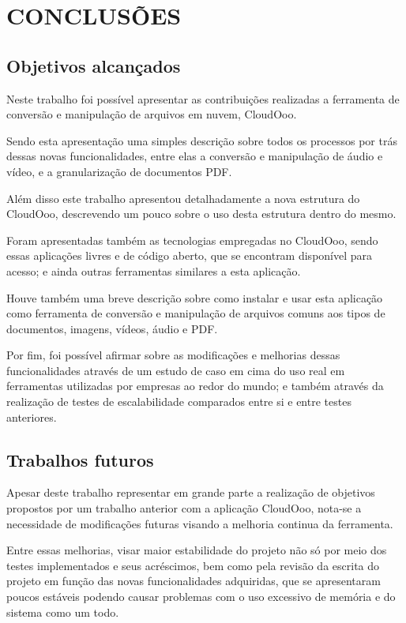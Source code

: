 \chapter{CONCLUSÕES}
\thispagestyle{empty}

\section{Objetivos alcançados}

Neste trabalho foi possível apresentar as contribuições realizadas a ferramenta de conversão e manipulação de arquivos em nuvem, CloudOoo.

Sendo esta apresentação uma simples descrição sobre todos os processos por trás dessas novas funcionalidades, entre elas a conversão e manipulação de áudio e vídeo, e a granularização de documentos PDF.

Além disso este trabalho apresentou detalhadamente a nova estrutura do CloudOoo, descrevendo um pouco sobre o uso desta estrutura dentro do mesmo.

Foram apresentadas também as tecnologias empregadas no CloudOoo, sendo essas aplicações livres e de código aberto, que se encontram disponível para acesso; e ainda outras ferramentas similares a esta aplicação.

Houve também uma breve descrição sobre como instalar e usar esta aplicação como ferramenta de conversão e manipulação de arquivos comuns aos tipos de documentos, imagens, vídeos, áudio e PDF.

Por fim, foi possível afirmar sobre as modificações e melhorias dessas funcionalidades através de um estudo de caso em cima do uso real em ferramentas utilizadas por empresas ao redor do mundo; e também através da realização de testes de escalabilidade comparados entre si e entre testes anteriores.

\section{Trabalhos futuros}

Apesar deste trabalho representar em grande parte a realização de objetivos propostos por um trabalho anterior com a aplicação CloudOoo, nota-se a necessidade de modificações futuras visando a melhoria continua da ferramenta.

Entre essas melhorias, visar maior estabilidade do projeto não só por meio dos testes implementados e seus acréscimos, bem como pela revisão da escrita do projeto em função das novas funcionalidades adquiridas, que se apresentaram poucos estáveis podendo causar problemas com o uso excessivo de memória e do sistema como um todo.

